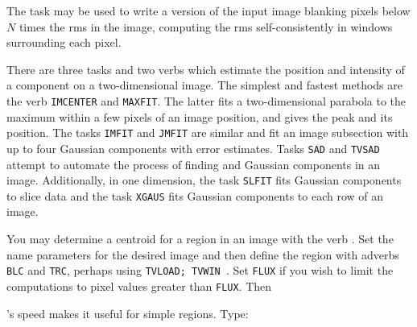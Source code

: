      The task {\tt {}} may be used to write a version of
the input image blanking pixels below $N$ times the rms in the image,
computing the rms self-consistently in windows surrounding each
pixel.


     There are three tasks and two verbs which estimate the position
and intensity of a component on a two-dimensional image.  The simplest
and fastest methods are the verb {\tt IMCENTER} and {\tt MAXFIT}\@.
The latter fits a two-dimensional parabola to the maximum within a few
pixels of an image position, and gives the peak and its position.  The
tasks {\tt IMFIT} and {\tt JMFIT} are similar and fit an image
subsection with up to four Gaussian components with error estimates.
Tasks {\tt SAD} and {\tt TVSAD} attempt to automate the process of
finding and  Gaussian components in an image.
Additionally, in one dimension, the task {\tt SLFIT} fits Gaussian
components to slice data and the task {\tt XGAUS} fits Gaussian
components to each row of an image.


     You may determine a centroid for a region in an image with the
verb {\tt {}}.  Set the name parameters for the desired
image and then define the region with adverbs {\tt BLC} and {\tt TRC},
perhaps using {\tt TVLOAD; TVWIN \CR}\@.  Set {\tt FLUX} if you wish
to limit the computations to pixel values greater than {\tt FLUX}\@.
Then 
\pd

     {\tt {}}'s speed makes it useful for simple regions.
Type:



